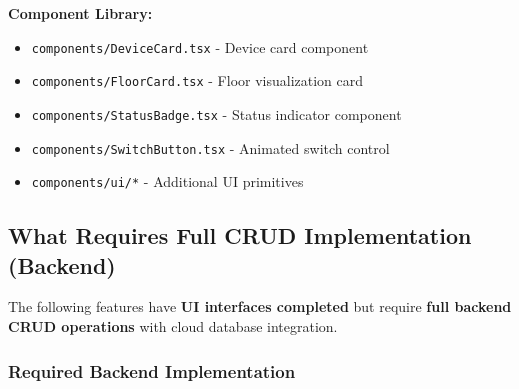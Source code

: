 \documentclass[12pt,a4paper]{article}
\begin{document}
\textbf{Component Library:}
\begin{itemize}
    \item \texttt{components/DeviceCard.tsx} - Device card component
    \item \texttt{components/FloorCard.tsx} - Floor visualization card
    \item \texttt{components/StatusBadge.tsx} - Status indicator component
    \item \texttt{components/SwitchButton.tsx} - Animated switch control
    \item \texttt{components/ui/*} - Additional UI primitives
\end{itemize}


\subsection{What Requires Full CRUD Implementation (Backend)}

The following features have \textbf{UI interfaces completed} but require \textbf{full backend CRUD operations} with cloud database integration.

\subsubsection{Required Backend Implementation}
\end{document}
